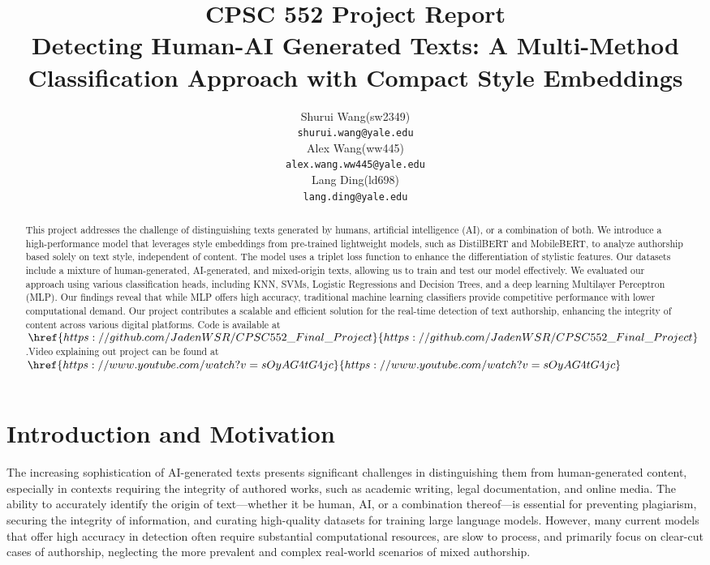 \documentclass{article}
\title{CPSC 552 Project Report\\Detecting Human-AI Generated Texts: A Multi-Method Classification Approach with Compact Style Embeddings}
\author{%
  Shurui Wang(sw2349) \\
  \texttt{shurui.wang@yale.edu} \\
  \And
  Alex Wang(ww445)\\
  \texttt{alex.wang.ww445@yale.edu} \\
  \And
  Lang Ding(ld698) \\
  \texttt{lang.ding@yale.edu} \\
}
\begin{document}
\maketitle
\begin{abstract}
This project addresses the challenge of distinguishing texts generated by humans, artificial intelligence (AI), or a combination of both. We introduce a high-performance model that leverages style embeddings from pre-trained lightweight models, such as DistilBERT and MobileBERT, to analyze authorship based solely on text style, independent of content. The model uses a triplet loss function to enhance the differentiation of stylistic features. Our datasets include a mixture of human-generated, AI-generated, and mixed-origin texts, allowing us to train and test our model effectively. We evaluated our approach using various classification heads, including KNN, SVMs, Logistic Regressions and Decision Trees, and a deep learning Multilayer Perceptron (MLP). Our findings reveal that while MLP offers high accuracy, traditional machine learning classifiers provide competitive performance with lower computational demand. Our project contributes a scalable and efficient solution for the real-time detection of text authorship, enhancing the integrity of content across various digital platforms. Code is available at $\href{https://github.com/JadenWSR/CPSC552\_Final\_Project}{https://github.com/JadenWSR/CPSC552\_Final\_Project}$.Video explaining out project can be found at $\href{https://www.youtube.com/watch?v=sOyAG4tG4jc}{https://www.youtube.com/watch?v=sOyAG4tG4jc}$
\end{abstract}
\section{Introduction and Motivation}


The increasing sophistication of AI-generated texts presents significant challenges in distinguishing them from human-generated content, especially in contexts requiring the integrity of authored works, such as academic writing, legal documentation, and online media. The ability to accurately identify the origin of text—whether it be human, AI, or a combination thereof—is essential for preventing plagiarism, securing the integrity of information, and curating high-quality datasets for training large language models. However, many current models that offer high accuracy in detection often require substantial computational resources, are slow to process, and primarily focus on clear-cut cases of authorship, neglecting the more prevalent and complex real-world scenarios of mixed authorship.
\end{document}
